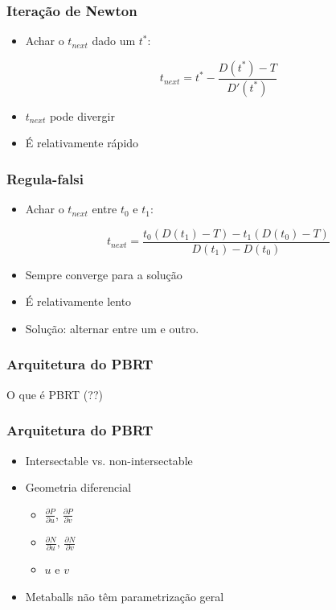 \documentclass[brazil]{beamer}
\begin{document}

    \begin{frame}
      \frametitle{Iteração de Newton}
      \begin{itemize}
        \item Achar o $t_{next}$ dado um $t^*$:
          \vspace{0.5em}
          \begin{center}
            $$ t_{next} = t^* - \frac{D(t^*) - T}{D'(t^*)} $$
          \end{center}        
        \item $t_{next}$ pode divergir
        \item É relativamente rápido
      \end{itemize}
    \end{frame}

    \begin{frame}
      \frametitle{Regula-falsi}
      \begin{itemize}
        \item Achar o $t_{next}$ entre $t_0$ e $t_1$:
          \vspace{0.5em}
          \begin{center}
            $$ t_{next} = \frac{t_0(D(t_1) - T) - t_1(D(t_0) - T)}{D(t_1) - D(t_0)} $$
          \end{center}        
        \item Sempre converge para a solução
        \item É relativamente lento
        \item Solução: alternar entre um e outro.
      \end{itemize}
    \end{frame}    

    \begin{frame}
      \frametitle{Arquitetura do PBRT}
      O que é PBRT (??)
    \end{frame}    

    \begin{frame}
      \frametitle{Arquitetura do PBRT}
      \begin{itemize}
        \item Intersectable vs. non-intersectable
        \item Geometria diferencial
        \begin{itemize}
          \vspace{0.2em}
          \item $ \frac{\partial P}{\partial u}\text{, }\frac{\partial P}{\partial v}$
          \vspace{0.2em}
          \item $ \frac{\partial N}{\partial u}\text{, }\frac{\partial N}{\partial v}$
          \vspace{0.2em}
          \item $u$ e $v$
        \end{itemize}
        \item Metaballs não têm parametrização geral
      \end{itemize}
    \end{frame}    
\end{document}
